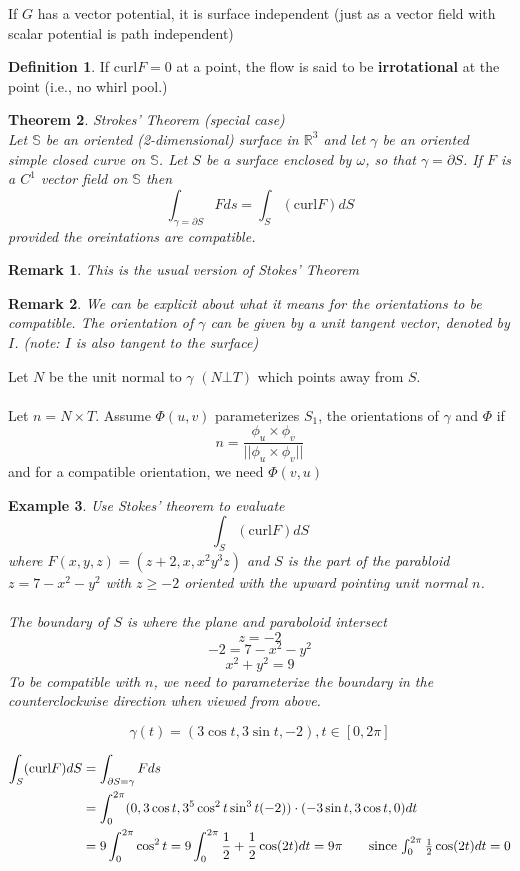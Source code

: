 \documentclass[12pt]{article}
\theoremstyle{plain}
\newtheorem*{remark}{Remark}
\newtheorem{theorem}{Theorem}[section]
\newtheorem{example}[theorem]{Example}
\theoremstyle{definition}
\newtheorem{definition}[theorem]{Definition}
\begin{document}
If $G$ has a vector potential, it is surface independent (just as a vector field with scalar potential is path independent)

\begin{definition}
	If $\text{curl} F = 0$ at a point, the flow is said to be \textbf{irrotational} at the point (i.e., no whirl pool.)
\end{definition}

\begin{theorem}
	Strokes' Theorem (special case)\\
	Let $\mathbb{S}$ be an oriented (2-dimensional) surface in $\mathbb{R}^3$ and let $\gamma$ be an oriented simple closed curve on $\mathbb{S}$. Let $S$ be a surface enclosed by $\omega$, so that $\gamma = \partial S$. If $F$ is a $C^1$ vector field on $\mathbb{S}$ then
	$$\int_{\gamma = \partial S} F ds = \int_S (\text{curl} F)dS$$
	provided the oreintations are compatible.
\end{theorem}

\begin{remark}
	This is the usual version of Stokes' Theorem
\end{remark}
\begin{remark}
	We can be explicit about what it means for the orientations to be compatible. The orientation of $\gamma$ can be given by a unit tangent vector, denoted by $I$. (note: $I$ is also tangent to the surface)
\end{remark}

Let $N$ be the unit normal to $\gamma$ $(N \bot T)$ which points away from $S$.\\
\\
Let $n = N \times T$. Assume $\Phi (u,v)$ parameterizes $S_1$, the orientations of $\gamma$ and $\Phi$ if
$$n = \frac{\phi_u \times \phi_v}{||\phi_u \times \phi_v||}$$
and for a compatible orientation, we need $\Phi (v,u)$

\begin{example}
	Use Stokes' theorem to evaluate
	$$\int_S (\text{curl} F) dS$$
	where $F(x,y,z)=(z+2, x, x^2 y^3 z)$
	and $S$ is the part of the parabloid $z=7-x^2-y^2$ with $z\geq -2$ oriented with the upward pointing unit normal $n$.\\
	\\
	The boundary of $S$ is where the plane and paraboloid intersect  $$z=-2$$
	$$-2=7-x^2-y^2$$
	$$x^2+y^2 = 9$$
	To be compatible with $n$, we need to parameterize the boundary in the counterclockwise direction when viewed from above.

	$$\gamma (t) = (3\cos t, 3\sin t, -2), t\in [0,2\pi]$$

	\begin{align*}
		\int_S (\text{curl} F) dS &=  \int_{\partial S = \gamma} F ds\\
		&= \int^{2\pi}_0 (0, 3\cos t, 3^5 \cos^2 t \sin^3 t (-2))\cdot (-3\sin t, 3\cos t, 0)dt\\
		&=9 \int^{2\pi}_0 \cos^2 t = 9 \int^{2\pi}_0 \frac{1}{2}+\frac{1}{2}\cos (2t)dt = 9\pi \tag*{since $\int^{2\pi}_0\frac{1}{2}\cos (2t)dt=0$}
	\end{align*}
\end{example}
\end{document}
